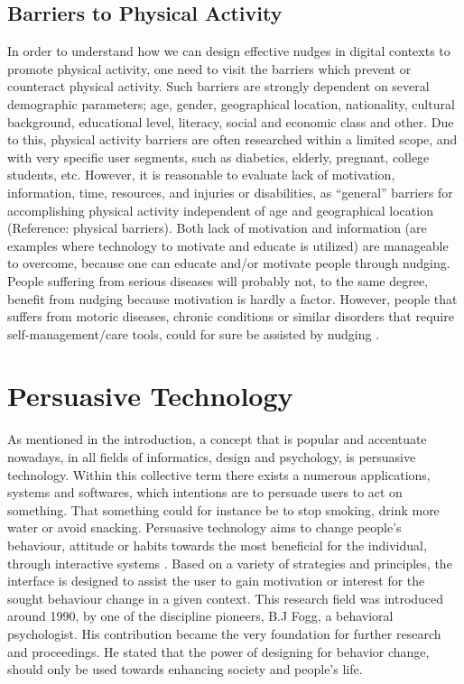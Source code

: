 \subsection{Barriers to Physical Activity} 
In order to understand how we can design effective nudges in digital contexts to promote physical activity, one need to visit the barriers which prevent or counteract physical activity. Such barriers are strongly dependent on several demographic parameters; age, gender, geographical location, nationality, cultural background, educational level, literacy, social and economic class and other\cite{sorensen_perceived_2008}.
Due to this, physical activity barriers are often researched within a limited scope, and with very specific user segments, such as diabetics, elderly, pregnant, college students, etc. However, it is reasonable to evaluate lack of motivation, information, time, resources, and injuries or disabilities, as “general” barriers for accomplishing physical activity independent of age and geographical location (Reference: physical barriers). Both lack of motivation and information (are examples where technology to motivate and educate is utilized) are manageable to overcome, because one can educate and/or motivate people through nudging. People suffering from serious diseases will probably not, to the same degree, benefit from nudging because motivation is hardly a factor. However, people that suffers from motoric diseases, chronic conditions or similar disorders that require self-management/care tools, could for sure be assisted by nudging \cite{rouyard_nudging_2018}.

\section{Persuasive Technology}
As mentioned in the introduction, a concept that is popular and accentuate nowadays, in all fields of informatics, design and psychology, is persuasive technology. Within this collective term there exists a numerous applications, systems and softwares, which intentions are to persuade users to act on something. That something could for instance be to stop smoking, drink more water or avoid snacking. Persuasive technology aims to change people’s behaviour, attitude or habits towards the most beneficial for the individual, through interactive systems \cite{orji_persuasive_2018}.
Based on a variety of strategies and principles, the interface is designed to assist the user to gain motivation or interest for the sought behaviour change in a given context. This research field was introduced around 1990, by one of the discipline pioneers, B.J Fogg, a behavioral psychologist. His contribution became the very foundation for further research and proceedings. He stated that the power of designing for behavior change, should only be used towards enhancing society and people's life.

